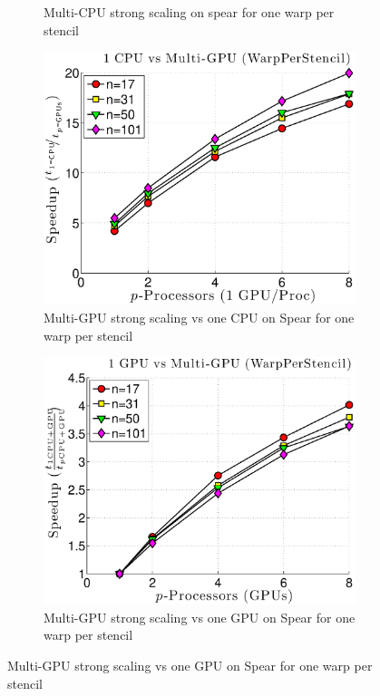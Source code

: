 \begin{figure}[htbp]
\begin{subfigure}[b]{0.425\textwidth}
\caption{Multi-CPU strong scaling on spear for one warp per stencil}
\label{fig:alltoall_multicpu_scaling}
\end{subfigure} 
\begin{subfigure}[b]{0.425\textwidth}
\centering
\includegraphics[width=1.0\textwidth]{../figures/spear_results/alltoallv/speedup_1CPU_vs_NGPU_WarpPerStencil.eps}
\caption{Multi-GPU strong scaling vs one CPU on Spear for one warp per stencil}
\label{fig:alltoall_multigpu_vs_cpu_scaling}
\end{subfigure} 
\begin{subfigure}[b]{0.425\textwidth}
\centering
\includegraphics[width=1.0\textwidth]{../figures/spear_results/alltoallv/speedup_1GPU_vs_NGPU_WarpPerStencil.eps}
\caption{Multi-GPU strong scaling vs one GPU on Spear for one warp per stencil}
\label{fig:alltoall_multigpu_vs_gpu_scaling}
\end{subfigure} 
\end{figure} 


